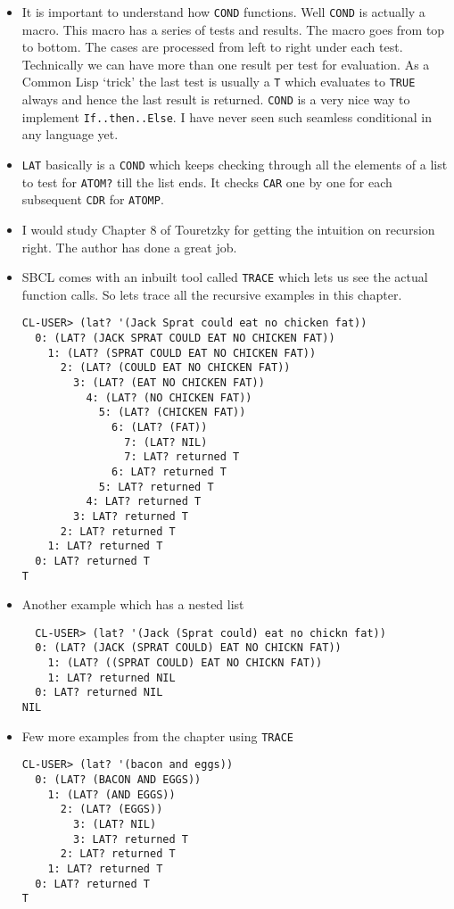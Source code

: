 \documentclass[11pt]{article}
\begin{document}
\begin{itemize}
\begin{verbatim}
\end{verbatim}
\item It is important to understand how \texttt{COND} functions. Well \texttt{COND} is actually a macro. This macro has a series of
tests and results. The macro goes from top to bottom. The cases are processed from left to right under each test.
Technically we can have more than one result per test for evaluation. As a Common Lisp `trick' the last test is
usually a \texttt{T} which evaluates to \texttt{TRUE} always and hence the last result is returned. \texttt{COND} is a very nice way to
implement \texttt{If..then..Else}. I have never seen such seamless conditional in any language yet.
\item \texttt{LAT} basically is a \texttt{COND} which keeps checking through all the elements of a list to test for \texttt{ATOM?} till the
list ends. It checks \texttt{CAR} one by one for each subsequent \texttt{CDR} for \texttt{ATOMP}.
\item I would study Chapter 8 of Touretzky for getting the intuition on recursion right. The author has done a great job.
\item SBCL comes with an inbuilt tool called \texttt{TRACE} which lets us see the actual function calls. So lets trace all the
recursive examples in this chapter.
\begin{verbatim}
CL-USER> (lat? '(Jack Sprat could eat no chicken fat))
  0: (LAT? (JACK SPRAT COULD EAT NO CHICKEN FAT))
    1: (LAT? (SPRAT COULD EAT NO CHICKEN FAT))
      2: (LAT? (COULD EAT NO CHICKEN FAT))
        3: (LAT? (EAT NO CHICKEN FAT))
          4: (LAT? (NO CHICKEN FAT))
            5: (LAT? (CHICKEN FAT))
              6: (LAT? (FAT))
                7: (LAT? NIL)
                7: LAT? returned T
              6: LAT? returned T
            5: LAT? returned T
          4: LAT? returned T
        3: LAT? returned T
      2: LAT? returned T
    1: LAT? returned T
  0: LAT? returned T
T

\end{verbatim}
\item Another example which has a nested list
\begin{verbatim}
  CL-USER> (lat? '(Jack (Sprat could) eat no chickn fat))
  0: (LAT? (JACK (SPRAT COULD) EAT NO CHICKN FAT))
    1: (LAT? ((SPRAT COULD) EAT NO CHICKN FAT))
    1: LAT? returned NIL
  0: LAT? returned NIL
NIL

\end{verbatim}
\item Few more examples from the chapter using \texttt{TRACE}
\begin{verbatim}
CL-USER> (lat? '(bacon and eggs))
  0: (LAT? (BACON AND EGGS))
    1: (LAT? (AND EGGS))
      2: (LAT? (EGGS))
        3: (LAT? NIL)
        3: LAT? returned T
      2: LAT? returned T
    1: LAT? returned T
  0: LAT? returned T
T


\end{verbatim}
\end{itemize}
\end{document}
